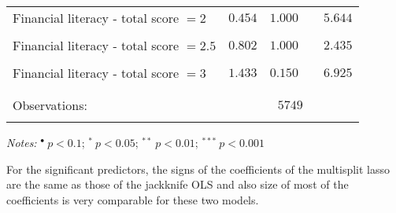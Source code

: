 \documentclass[a4paper,12pt]{article}
\begin{document}
{\begin{threeparttable}
\begin{small}
\begin{tabular}{lclrc}
\vspace{-0.2cm}Financial literacy - total score $=2$&$0.454$& $1.000$&&$5.644$\\
  \\
\vspace{-0.2cm}Financial literacy - total score $=2.5$&$0.802$& $1.000$&&$2.435$\\
  \\
  \vspace{-0.2cm}Financial literacy - total score $=3$&$1.433						$& $0.150$&&$6.925$\\
 \\
\hline
\vspace{-0.4cm} \\ Observations:&    \multicolumn{4}{c}{$5749$} \\  \vspace{-0.4cm}
\\
\hline
\end{tabular} 
\end{small}
 \begin{tablenotes}
  \begin{footnotesize}
    \item \textit{Notes:} \hspace{0.15cm}$^{\bullet}~p<0.1$; $^{*}~p<0.05$; $^{**}~p<0.01$; $^{***}~p<0.001$
    \begin{adjustwidth}{1cm}{} \item For the significant predictors, the signs of the coefficients of the multisplit lasso are the same as those of the jackknife OLS and also size of most of the coefficients is very comparable for these two models.
     \end{adjustwidth}
\singlespacing
  \end{footnotesize}
\end{tablenotes}
  \end{threeparttable} 
\par}
\linespread{1}

\pagebreak
\end{document}

